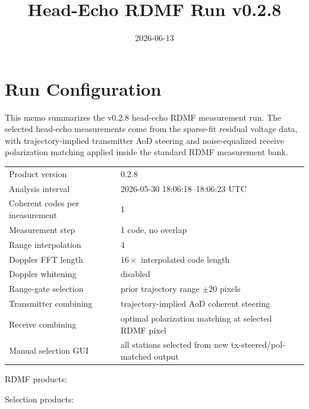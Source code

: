 \documentclass[11pt]{article}
\title{Head-Echo RDMF Run v0.2.8}
\author{}
\date{2026-06-13}
\begin{document}
\maketitle




\section*{Run Configuration}

This memo summarizes the v0.2.8 head-echo RDMF measurement run.  The selected
head-echo measurements come from the sparse-fit residual voltage data, with
trajectory-implied transmitter AoD steering and noise-equalized receive
polarization matching applied inside the standard RDMF measurement bank.

\begin{center}
\begin{tabular}{ll}
\toprule
Product version & 0.2.8 \\
Analysis interval & 2026-05-30 18:06:18--18:06:23 UTC \\
Coherent codes per measurement & 1 \\
Measurement step & 1 code, no overlap \\
Range interpolation & 4 \\
Doppler FFT length & $16\times$ interpolated code length \\
Doppler whitening & disabled \\
Range-gate selection & prior trajectory range $\pm 20$ pixels \\
Transmitter combining & trajectory-implied AoD coherent steering \\
Receive combining & optimal polarization matching at selected RDMF pixel \\
Manual selection GUI & all stations selected from new tx-steered/pol-matched output \\
\bottomrule
\end{tabular}
\end{center}

\noindent RDMF products:

\noindent Selection products:
\end{document}
